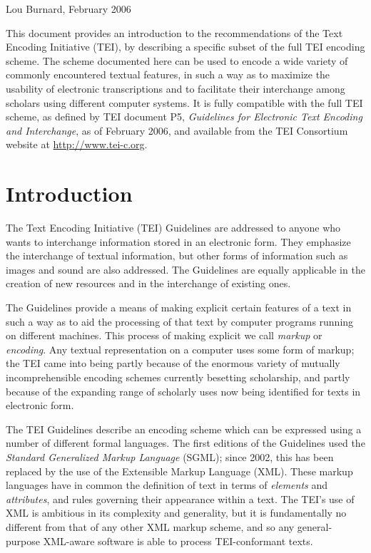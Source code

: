 \documentclass[11pt,twoside]{article}\makeatletter
\makeatletter
\renewcommand\section{\@startsection {section}{1}{\z@}%
     {-1.75ex \@plus -0.5ex \@minus -.2ex}%
     {0.5ex \@plus .2ex}%
     {\reset@font\Large\bfseries\sffamily}}
\def\chaptername{Chapter}
\def\mainmatter{%
  \cleardoublepage
  \def\thechapter{\@arabic\c@chapter}
  \setcounter{chapter}{0}
  \setcounter{section}{0}
  \pagenumbering{arabic}
  \setcounter{secnumdepth}{6}
  \def\@chapapp{\chaptername}%
  \def\theHchapter{\arabic{chapter}}
}
\def\DivI{\section}
\def\DivI{\chapter}
\makeatother
\begin{document}
\begin{raggedleft}Lou Burnard, February 2006\end{raggedleft}

\mainmatter \par
This document provides an introduction to the recommendations of the Text Encoding Initiative (TEI), by describing a specific subset of the full TEI encoding scheme. The scheme documented here can be used to encode a wide variety of commonly encountered textual features, in such a way as to maximize the usability of electronic transcriptions and to facilitate their interchange among scholars using different computer systems. It is fully compatible with the full TEI scheme, as defined by TEI document P5, \textit{Guidelines for Electronic Text Encoding and Interchange}, as of February 2006, and available from the TEI Consortium website at \url{http://www.tei-c.org}. 
\DivI[Introduction]{Introduction}\label{U5-Intro}\par
The Text Encoding Initiative (TEI) Guidelines are addressed to anyone who wants to interchange information stored in an electronic form. They emphasize the interchange of textual information, but other forms of information such as images and sound are also addressed. The Guidelines are equally applicable in the creation of new resources and in the interchange of existing ones.\par
The Guidelines provide a means of making explicit certain         features of a text in such a way as to aid the processing of         that text by computer programs running on different         machines. This process of making explicit we call         \emph{markup} or \emph{encoding}.  Any textual         representation on a computer uses some form of markup; the TEI         came into being partly because of the enormous variety of         mutually incomprehensible encoding schemes currently besetting         scholarship, and partly because of the expanding range of         scholarly uses now being identified for texts in electronic         form.\par
The TEI Guidelines describe an encoding scheme which can be         expressed using a number of different formal languages. The         first editions of the Guidelines used the \emph{Standard         Generalized Markup Language} (SGML); since 2002, this         has been replaced by the use of the Extensible Markup Language         (XML). These markup languages have in common the definition of         text in terms of \emph{elements} and         \emph{attributes}, and rules governing their appearance         within a text. The TEI's use of XML is ambitious in its         complexity and generality, but it is fundamentally no         different from that of any other XML markup scheme, and so any         general-purpose XML-aware software is able to process         TEI-conformant texts.\par
\end{document}
